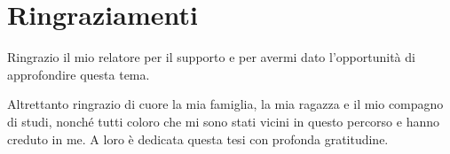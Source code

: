 \chapter*{Ringraziamenti}
Ringrazio il mio relatore per il supporto e per avermi dato l'opportunità di approfondire questa tema.

Altrettanto ringrazio di cuore la mia famiglia, la mia ragazza e il mio compagno di studi, nonché tutti coloro che mi sono
stati vicini in questo percorso e hanno creduto in me. A loro è dedicata questa tesi con profonda gratitudine.